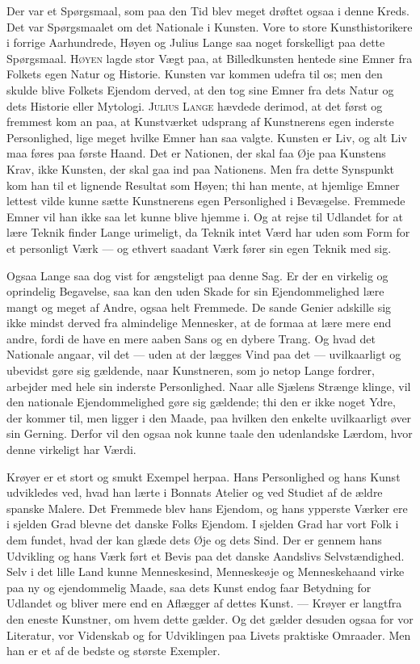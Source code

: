 \documentclass[12pt,a4paper,openany]{book}
\newcommand{\opage}[1]{\marginnote{\footnotesize\textit{[#1]}}}
\begin{document}
Der var et Spørgsmaal, som paa den Tid blev meget
drøftet ogsaa i denne Kreds. Det var Spørgsmaalet om det
Nationale i Kunsten. Vore to store Kunsthistorikere i forrige
Aarhundrede, Høyen og Julius Lange saa noget forskelligt paa
dette Spørgsmaal. \textsc{Høyen} lagde stor Vægt paa, at Billedkunsten
hentede sine Emner fra Folkets egen Natur og Historie.
Kunsten var kommen udefra til os; men den skulde blive Folkets
Ejendom derved, at den tog sine Emner fra dets Natur
og dets Historie eller Mytologi. \textsc{Julius Lange} hævdede derimod,
at det først og fremmest kom an paa, at Kunstværket
udsprang af Kunstnerens egen inderste Personlighed, lige meget
hvilke Emner han saa valgte. Kunsten er Liv, og alt Liv maa
føres paa første Haand. Det er Nationen, der skal faa Øje
paa Kunstens Krav, ikke Kunsten, der skal gaa ind paa Nationens.
Men fra dette Synspunkt kom han til et lignende Resultat
som Høyen; thi han mente, at hjemlige Emner lettest
vilde kunne sætte Kunstnerens egen Personlighed i Bevægelse.
Fremmede Emner vil han ikke saa let kunne blive hjemme i.
Og at rejse til Udlandet for at lære Teknik finder Lange urimeligt,
da Teknik intet Værd har uden som Form for et personligt
Værk --- og ethvert saadant Værk fører sin egen Teknik
med sig.

Ogsaa Lange saa dog vist for ængsteligt paa denne Sag.
Er der en virkelig og oprindelig Begavelse, saa kan den uden
Skade for sin Ejendommelighed lære mangt og meget af Andre,
ogsaa helt Fremmede. De sande Genier adskille sig ikke
mindst derved fra almindelige Mennesker, at de formaa at
lære mere end andre, fordi de have en mere aaben Sans og en
dybere Trang. Og hvad det Nationale angaar, vil det --- uden
at der lægges Vind paa det --- uvilkaarligt og ubevidst gøre
sig gældende, naar Kunstneren, som jo netop Lange fordrer,
\setcounter{footnote}{0}%
\opage{198}arbejder med hele sin inderste Personlighed. Naar alle Sjælens
Strænge klinge, vil den nationale Ejendommelighed gøre sig
gældende; thi den er ikke noget Ydre, der kommer til, men
ligger i den Maade, paa hvilken den enkelte uvilkaarligt øver
sin Gerning. Derfor vil den ogsaa nok kunne taale den udenlandske
Lærdom, hvor denne virkeligt har Værdi.

Krøyer er et stort og smukt Exempel herpaa. Hans Personlighed
og hans Kunst udvikledes ved, hvad han lærte i
Bonnats Atelier og ved Studiet af de ældre spanske Malere.
Det Fremmede blev hans Ejendom, og hans ypperste Værker ere
i sjelden Grad blevne det danske Folks Ejendom. I sjelden
Grad har vort Folk i dem fundet, hvad der kan glæde dets
Øje og dets Sind. Der er gennem hans Udvikling og hans
Værk ført et Bevis paa det danske Aandslivs Selvstændighed.
Selv i det lille Land kunne Menneskesind, Menneskeøje og Menneskehaand
virke paa ny og ejendommelig Maade, saa dets
Kunst endog faar Betydning for Udlandet og bliver mere end
en Aflægger af dettes Kunst. --- Krøyer er langtfra den eneste
Kunstner, om hvem dette gælder. Og det gælder desuden ogsaa
for vor Literatur, vor Videnskab og for Udviklingen paa
Livets praktiske Omraader. Men han er et af de bedste og
største Exempler.
\end{document}
